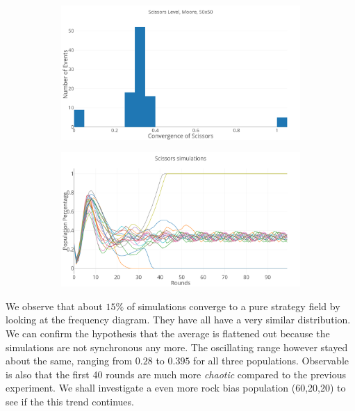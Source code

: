 \documentclass[a4paper, 11pt]{article}
\begin{document}
\begin{figure}[H]
	\begin{subfigure}{0.52\textwidth}
		\includegraphics[width=1\linewidth]{50x50_50RockDist_ScissorsHG}
	\end{subfigure}%
	\begin{subfigure}{0.52\textwidth}
		\includegraphics[width=1\linewidth]{50x50_50RockDist_IndividualScissors}
	\end{subfigure}
\end{figure}

	We observe that about $15\%$ of simulations converge to a pure strategy field by looking at the frequency diagram. They have all have a very similar distribution. We can confirm the hypothesis that the average is flattened out because the simulations are not synchronous any more. The oscillating range however stayed about the same, ranging from $0.28$ to $0.395$ for all three populations. Observable is also that the first 40 rounds are much more \textit{chaotic} compared to the previous experiment. We shall investigate a even more rock bias population (60,20,20) to see if the this trend continues.
\end{document}
